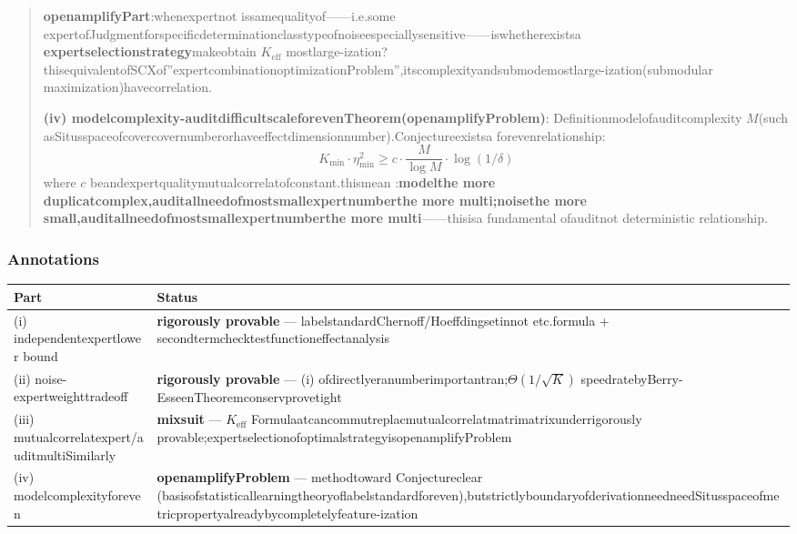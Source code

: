 \documentclass[
  12pt,
]{article}
\begin{document}
\begin{quote}
\textbf{openamplifyPart}:whenexpertnot issamequalityof------i.e.some expertofJudgmentforspecificdeterminationclasstypeofnoiseespeciallysensitive------iswhetherexistsa  \textbf{expertselectionstrategy}makeobtain
\(K_{\text{eff}}\)
mostlarge-ization?thisequivalentofSCXof''expertcombinationoptimizationProblem'',itscomplexityandsubmodemostlarge-ization(submodular
maximization)havecorrelation.

\textbf{(iv) modelcomplexity-auditdifficultscaleforevenTheorem(openamplifyProblem)}:
Definitionmodelofauditcomplexity
\(M\)(such asSitusspaceofcovercovernumberorhaveeffectdimensionnumber).Conjectureexistsa  forevenrelationship:
\[K_{\min} \cdot \eta_{\min}^2 \geq c \cdot \frac{M}{\log M} \cdot \log(1/\delta)\]
where \(c\)
beandexpertqualitymutualcorrelatofconstant.thismean  :\textbf{modelthe more duplicatcomplex,auditallneedofmostsmallexpertnumberthe more multi;noisethe more small,auditallneedofmostsmallexpertnumberthe more multi}------thisisa  fundamental ofauditnot deterministic relationship.
\end{quote}

\subsubsection{Annotations}\label{ux6807ux6ce8-2}

\begin{longtable}[]{@{}
  >{\raggedright\arraybackslash}p{}
  >{\raggedright\arraybackslash}p{}@{}}
\toprule\noalign{}
\begin{minipage}[b]{\linewidth}\raggedright
Part
\end{minipage} & \begin{minipage}[b]{\linewidth}\raggedright
Status
\end{minipage} \\
\midrule\noalign{}
\endhead
\bottomrule\noalign{}
\endlastfoot
(i) independentexpertlower bound & \textbf{rigorously provable} ---
labelstandardChernoff/Hoeffdingsetinnot etc.formula + secondtermchecktestfunctioneffectanalysis \\
(ii) noise-expertweighttradeoff & \textbf{rigorously provable} --- (i)
ofdirectlyeranumberimportantran;\(\Theta(1/\sqrt{K})\) speedratebyBerry-EsseenTheoremconservprovetight  \\
(iii) mutualcorrelatexpert/auditmultiSimilarly  & \textbf{mixsuit} --- \(K_{\text{eff}}\)
Formulaatcancommutreplacmutualcorrelatmatrimatrixunderrigorously provable;expertselectionofoptimalstrategyisopenamplifyProblem \\
(iv) modelcomplexityforeven & \textbf{openamplifyProblem} ---
methodtoward Conjectureclear (basisofstatisticallearningtheoryoflabelstandardforeven),butstrictlyboundaryofderivationneedneedSitusspaceofmetricpropertyalreadybycompletelyfeature-ization \\
\end{longtable}
\end{document}
